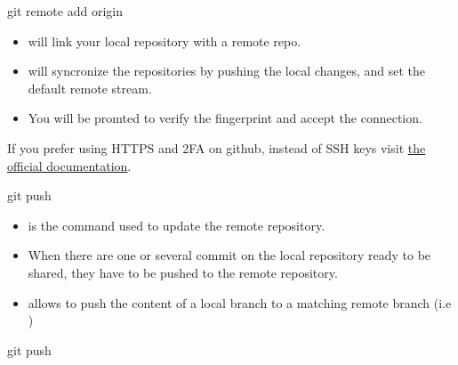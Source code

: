 \begin{frame}[fragile]{git remote add origin}
    \begin{itemize}
        \item {} will link your local repository with a remote repo.
        \item {} will syncronize the repositories by \alert{pushing} the local changes, and set the default remote stream.
        \item You will be promted to verify the fingerprint and accept the connection.
    \end{itemize}
        If you prefer using HTTPS and 2FA on github, instead of SSH keys visit \href{https://docs.github.com/en/github/getting-started-with-github/about-remote-repositories#cloning-with-https-urls}{the official documentation}.
\end{frame}

\begin{frame}[fragile]{git push}
    \begin{itemize}
        \item {} is the command used to update the remote repository.
        \item When there are one or several commit on the local repository ready to be shared, they have to be pushed to the remote repository.
        \item {} allows to push the content of a local branch to a matching remote branch (i.e )
    \end{itemize}
\end{frame}

\begin{frame}[fragile]{git push \insertcontinuationtext}
\end{frame}

